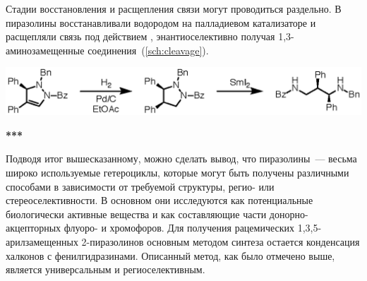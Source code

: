 Стадии восстановления и расщепления связи  могут проводиться раздельно.
В~\cite{Hashimoto2013} пиразолины восстанавливали водородом на палладиевом катализаторе и расщепляли связь  под действием , энантиоселективно получая 1,3-аминозамещенные соединения~(\ref{sch:cleavage}).

\begin{scheme}[h!]
    \centering
    \includegraphics{sections/literature/img/cleavage.eps}
    \caption{}
    \label{sch:cleavage}
\end{scheme}
\FloatBarrier{}

\begin{center}
    \LARGE
    \textbf{***}
\end{center}

Подводя итог вышесказанному, можно сделать вывод, что пиразолины~--- весьма широко используемые гетероциклы, которые могут быть получены различными способами в зависимости от требуемой структуры, регио- или стереоселективности.
В основном они исследуются как потенциальные биологически активные вещества и как составляющие части донорно-акцепторных флуоро- и хромофоров.
Для получения рацемических 1,3,5-арилзамещенных 2-пиразолинов основным методом синтеза остается конденсация халконов с фенилгидразинами.
Описанный метод, как было отмечено выше, является универсальным и региоселективным. 
